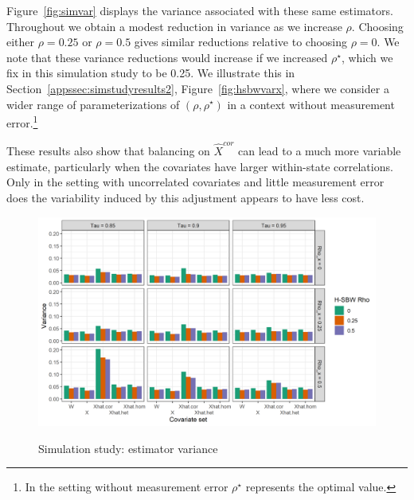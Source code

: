 Figure~\ref{fig:simvar} displays the variance associated with these same estimators. Throughout we obtain a modest reduction in variance as we increase $\rho$. Choosing either $\rho = 0.25$ or $\rho = 0.5$ gives similar reductions relative to choosing $\rho = 0$. We note that these variance reductions would increase if we increased $\rho^\star$, which we fix in this simulation study to be 0.25. We illustrate this in Section~\ref{appssec:simstudyresults2}, Figure~\ref{fig:hsbwvarx}, where we consider a wider range of parameterizations of $(\rho, \rho^\star)$ in a context without measurement error.\footnote{In the setting without measurement error $\rho^\star$ represents the optimal value.}

These results also show that balancing on $\hat{X}^{cor}$ can lead to a much more variable estimate, particularly when the covariates have larger within-state correlations. Only in the setting with uncorrelated covariates and little measurement error does the variability induced by this adjustment appears to have less cost.

\begin{figure}[H]
\begin{center}
    \caption{Simulation study: estimator variance}\label{fig:simvar}
    \label{fig:loveplotc1}
    \includegraphics[scale=0.5]{01_Plots/var-plot.png}
\end{center}
\end{figure}

